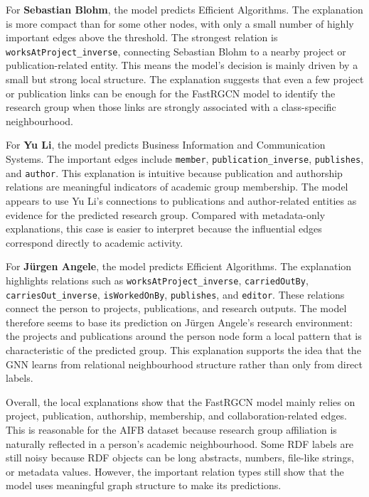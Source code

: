 \documentclass[10pt,a4paper]{article}
\begin{document}
For \textbf{Sebastian Blohm}, the model predicts Efficient Algorithms. The
explanation is more compact than for some other nodes, with only a small number
of highly important edges above the threshold. The strongest relation is
\texttt{worksAtProject\_inverse}, connecting Sebastian Blohm to a nearby
project or publication-related entity. This means the model's decision is
mainly driven by a small but strong local structure. The explanation suggests
that even a few project or publication links can be enough for the FastRGCN
model to identify the research group when those links are strongly associated
with a class-specific neighbourhood.

For \textbf{Yu Li}, the model predicts Business Information and Communication
Systems. The important edges include \texttt{member},
\texttt{publication\_inverse}, \texttt{publishes}, and \texttt{author}. This
explanation is intuitive because publication and authorship relations are
meaningful indicators of academic group membership. The model appears to use Yu
Li's connections to publications and author-related entities as evidence for
the predicted research group. Compared with metadata-only explanations, this
case is easier to interpret because the influential edges correspond directly
to academic activity.

For \textbf{J\"urgen Angele}, the model predicts Efficient Algorithms. The
explanation highlights relations such as \texttt{worksAtProject\_inverse},
\texttt{carriedOutBy}, \texttt{carriesOut\_inverse},
\texttt{isWorkedOnBy}, \texttt{publishes}, and \texttt{editor}. These
relations connect the person to projects, publications, and research outputs.
The model therefore seems to base its prediction on J\"urgen Angele's research
environment: the projects and publications around the person node form a local
pattern that is characteristic of the predicted group. This explanation
supports the idea that the GNN learns from relational neighbourhood structure
rather than only from direct labels.

Overall, the local explanations show that the FastRGCN model mainly relies on
project, publication, authorship, membership, and collaboration-related edges.
This is reasonable for the AIFB dataset because research group affiliation is
naturally reflected in a person's academic neighbourhood. Some RDF labels are
still noisy because RDF objects can be long abstracts, numbers, file-like
strings, or metadata values. However, the important relation types still show
that the model uses meaningful graph structure to make its predictions.
\end{document}
